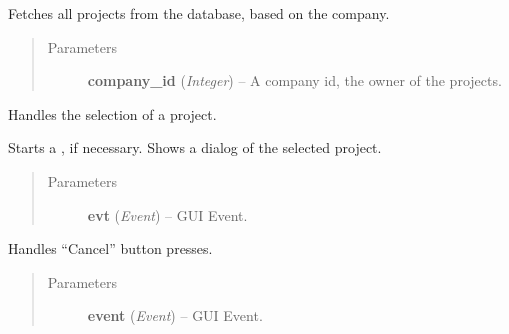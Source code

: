\documentclass[letterpaper,10pt,english]{sphinxmanual}
\begin{document}
\begin{fulllineitems}
\begin{fulllineitems}
\begin{quote}
\begin{description}
\end{description}\end{quote}

\end{fulllineitems}


\begin{fulllineitems}
\label{wos:wos.ProjectSelectDialog.GetProjects}
Fetches all projects from the database, based on the company.
\begin{quote}\begin{description}
\item[{Parameters}] \leavevmode
\textbf{company\_id} (\emph{Integer}) -- A company id, the owner of the projects.

\end{description}\end{quote}

\end{fulllineitems}


\begin{fulllineitems}
\label{wos:wos.ProjectSelectDialog.SelEvent}
Handles the selection of a project.

Starts a {\hyperref[wos:wos.CURRENT_PROJECT]{}}, if necessary.
Shows a dialog of the selected project.
\begin{quote}\begin{description}
\item[{Parameters}] \leavevmode
\textbf{evt} (\emph{Event}) -- GUI Event.

\end{description}\end{quote}

\end{fulllineitems}


\begin{fulllineitems}
\label{wos:wos.ProjectSelectDialog.onCancel}
Handles ``Cancel'' button presses.
\begin{quote}\begin{description}
\item[{Parameters}] \leavevmode
\textbf{event} (\emph{Event}) -- GUI Event.

\end{description}\end{quote}

\end{fulllineitems}


\end{fulllineitems}
\end{document}
